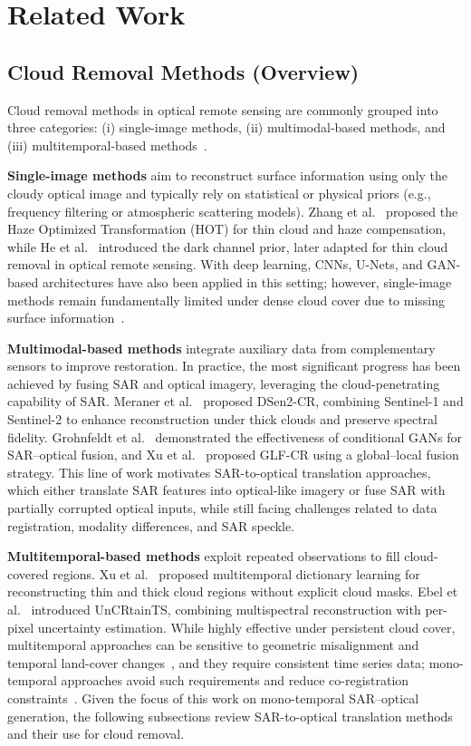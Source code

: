 \section{Related Work}
\subsection{Cloud Removal Methods (Overview)}
Cloud removal methods in optical remote sensing are commonly grouped into three categories: (i) single-image methods, (ii) multimodal-based methods, and (iii) multitemporal-based methods~\cite{CR_Advances_Review_ORS}.

\textbf{Single-image methods} aim to reconstruct surface information using only the cloudy optical image and typically rely on statistical or physical priors (e.g., frequency filtering or atmospheric scattering models). Zhang et al.~\cite{single_variation} proposed the Haze Optimized Transformation (HOT) for thin cloud and haze compensation, while He et al.~\cite{single_haze_removal_dark_prior} introduced the dark channel prior, later adapted for thin cloud removal in optical remote sensing. With deep learning, CNNs, U-Nets, and GAN-based architectures have also been applied in this setting; however, single-image methods remain fundamentally limited under dense cloud cover due to missing surface information~\cite{CR_Advances_Review_ORS}.

\textbf{Multimodal-based methods} integrate auxiliary data from complementary sensors to improve restoration. In practice, the most significant progress has been achieved by fusing SAR and optical imagery, leveraging the cloud-penetrating capability of SAR. Meraner et al.~\cite{CR_SEN2_dRNN} proposed DSen2-CR, combining Sentinel-1 and Sentinel-2 to enhance reconstruction under thick clouds and preserve spectral fidelity. Grohnfeldt et al.~\cite{A_cGAN_fuse_sar_MS_CR} demonstrated the effectiveness of conditional GANs for SAR–optical fusion, and Xu et al.~\cite{GLF_CR} proposed GLF-CR using a global--local fusion strategy. This line of work motivates SAR-to-optical translation approaches, which either translate SAR features into optical-like imagery or fuse SAR with partially corrupted optical inputs, while still facing challenges related to data registration, modality differences, and SAR speckle.

\textbf{Multitemporal-based methods} exploit repeated observations to fill cloud-covered regions. Xu et al.~\cite{CR_spars_repre_MT_dict_L} proposed multitemporal dictionary learning for reconstructing thin and thick cloud regions without explicit cloud masks. Ebel et al.~\cite{UnCRtainTS} introduced UnCRtainTS, combining multispectral reconstruction with per-pixel uncertainty estimation. While highly effective under persistent cloud cover, multitemporal approaches can be sensitive to geometric misalignment and temporal land-cover changes~\cite{expl_ML_CR_Cameroon}, and they require consistent time series data; mono-temporal approaches avoid such requirements and reduce co-registration constraints~\cite{kiwa_auto_Delineation_BAs}. Given the focus of this work on mono-temporal SAR--optical generation, the following subsections review SAR-to-optical translation methods and their use for cloud removal.

